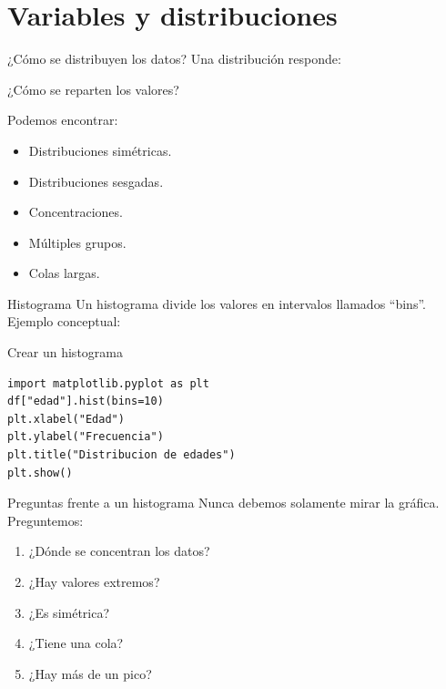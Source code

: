 \documentclass[aspectratio=169,11pt]{beamer}
\begin{document}
\section{Variables y distribuciones}
\begin{frame}{¿Cómo se distribuyen los datos?}
Una distribución responde:
\begin{center}
\Large
¿Cómo se reparten los valores?
\end{center}
Podemos encontrar:
\begin{itemize}
    \item Distribuciones simétricas.
    \item Distribuciones sesgadas.
    \item Concentraciones.
    \item Múltiples grupos.
    \item Colas largas.
\end{itemize}
\end{frame}
\begin{frame}{Histograma}
Un histograma divide los valores en intervalos llamados ``bins''.
Ejemplo conceptual:
\begin{center}
\end{center}
\end{frame}
\begin{frame}[fragile]{Crear un histograma}
\begin{lstlisting}
import matplotlib.pyplot as plt
df["edad"].hist(bins=10)
plt.xlabel("Edad")
plt.ylabel("Frecuencia")
plt.title("Distribucion de edades")
plt.show()
\end{lstlisting}
\end{frame}
\begin{frame}{Preguntas frente a un histograma}
Nunca debemos solamente mirar la gráfica.
Preguntemos:
\begin{enumerate}
    \item ¿Dónde se concentran los datos?
    \item ¿Hay valores extremos?
    \item ¿Es simétrica?
    \item ¿Tiene una cola?
    \item ¿Hay más de un pico?
\end{enumerate}
\end{frame}
\end{document}
